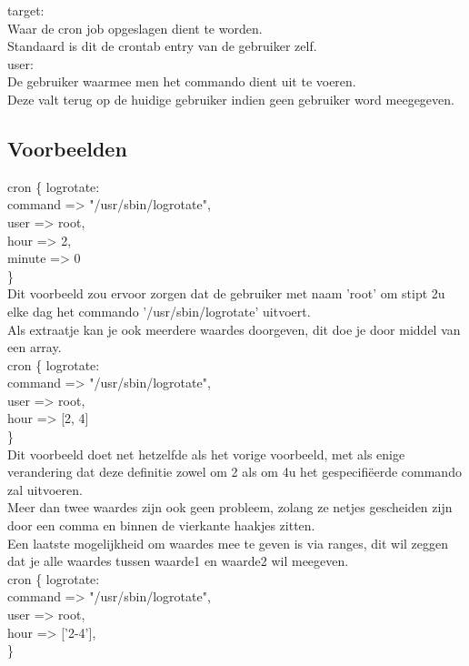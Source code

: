 target:\\
Waar de cron job opgeslagen dient te worden.\\
Standaard is dit de crontab entry van de gebruiker zelf.\\

user:\\
De gebruiker waarmee men het commando dient uit te voeren.\\
Deze valt terug op de huidige gebruiker indien geen gebruiker word meegegeven.\\

\subsection{Voorbeelden}
	cron \{ logrotate:\\
		command => "/usr/sbin/logrotate",\\
		user => root,\\
		hour => 2,\\
		minute => 0\\
	\}\\

	Dit voorbeeld zou ervoor zorgen dat de gebruiker met naam 'root' om stipt 2u elke dag het commando '/usr/sbin/logrotate' uitvoert.\\
	Als extraatje kan je ook meerdere waardes doorgeven, dit doe je door middel van een array.\\

	cron \{ logrotate:\\
		command => "/usr/sbin/logrotate",\\
		user => root,\\
		hour => [2, 4]\\
	\}\\

	Dit voorbeeld doet net hetzelfde als het vorige voorbeeld, met als enige verandering dat deze definitie zowel om 2 als om 4u het gespecifi\"{e}erde commando zal uitvoeren.\\
	Meer dan twee waardes zijn ook geen probleem, zolang ze netjes gescheiden zijn door een comma en binnen de vierkante haakjes zitten.\\

	Een laatste mogelijkheid om waardes mee te geven is via ranges, dit wil zeggen dat je alle waardes tussen waarde1 en waarde2 wil meegeven.\\

	cron \{ logrotate:\\
		command => "/usr/sbin/logrotate",\\
		user => root,\\
		hour => ['2-4'],\\
	\}\\


